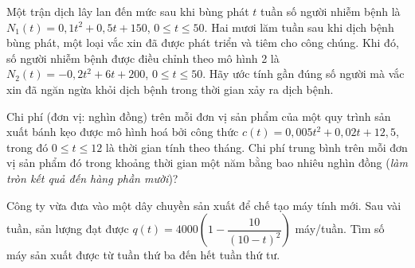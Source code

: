 \begin{bt}%
	Một trận dịch lây lan  đến mức sau khi bùng phát $t$ tuần số người nhiễm bệnh là $N_1(t)=0{,}1 t^2+0{,}5t+150$, $0\le t\le 50$. Hai mươi lăm tuần sau khi dịch bệnh bùng phát, một loại vắc xin đã được phát triển và tiêm cho công chúng. Khi đó, số người nhiễm bệnh được điều chỉnh theo mô hình 2 là $N_2(t)=-0{,}2 t^2+6t+200$, $0\le t\le 50$. Hãy ước tính gần đúng số người mà vắc xin đã ngăn ngừa khỏi dịch bệnh trong thời gian xảy ra dịch bệnh.
\end{bt}

\begin{bt}%
	Chi phí (đơn vị: nghìn đồng) trên mỗi đơn vị sản phẩm của một quy trình sản xuất bánh kẹo được  mô hình hoá bởi công thức $c(t)=0{,}005t^2+0{,}02t+12{,}5$, trong đó $0\le t\le12$ là thời gian tính theo tháng.
	Chi phí trung bình trên mỗi đơn vị sản phẩm đó trong khoảng thời gian một năm bằng bao nhiêu nghìn đồng (\textit{làm tròn kết  quả đến hàng phần mười})?
\end{bt}

\begin{bt}%
	Công ty vừa  đưa vào một dây chuyền sản xuất để chế tạo máy tính mới. Sau vài tuần, sản lượng đạt được $q(t)=4000\left(1-\dfrac{10}{(10-t)^2}\right)$ máy/tuần. Tìm số máy sản xuất được từ tuần thứ ba đến hết tuần thứ tư.
\end{bt}

